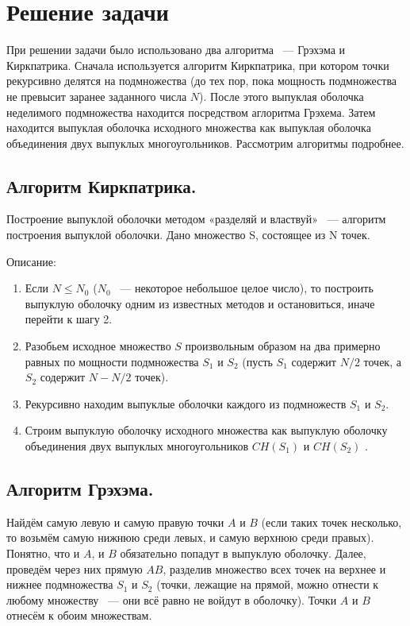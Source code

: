 \documentclass[12pt]{article}
\begin{document}
\section{Решение задачи}
При решении задачи было использовано два алгоритма ~--- Грэхэма и Киркпатрика. Сначала используется алгоритм Киркпатрика, при котором точки рекурсивно делятся на подмножества (до тех пор, пока мощность подмножества не превысит заранее заданного числа $N$). После этого выпуклая оболочка неделимого подмножества находится посредством аглоритма Грэхема. Затем находится выпуклая оболочка исходного множества как выпуклая оболочка объединения двух выпуклых многоугольников.
Рассмотрим алгоритмы подробнее.
\subsection {Алгоритм Киркпатрика.}
Построение выпуклой оболочки методом «разделяй и властвуй» ~--- алгоритм построения выпуклой оболочки.
Дано множество  S, состоящее из  N  точек.


Описание:
\begin {enumerate}
\item Если  $N \leqslant N_0$ ($N_0$ ~--- некоторое небольшое целое число), то построить выпуклую оболочку одним из известных методов и остановиться, иначе перейти к шагу 2.
\item Разобьем исходное множество  $S$  произвольным образом на два примерно равных по мощности подмножества $S_1$ и $S_2$ (пусть $S_1$ содержит  $N/2$  точек, а $S_2$ содержит  $N - N/2$  точек).
\item Рекурсивно находим выпуклые оболочки каждого из подмножеств $S_1$ и $S_2$.
\item Строим выпуклую оболочку исходного множества как выпуклую оболочку объединения двух выпуклых многоугольников  $CH(S_1)$  и  $CH(S_2)$ .
\end{enumerate}
\subsection {Алгоритм Грэхэма.}


Найдём самую левую и самую правую точки $A$ и $B$ (если таких точек несколько, то возьмём самую нижнюю среди левых, и самую верхнюю среди правых). Понятно, что и $A$, и $B$ обязательно попадут в выпуклую оболочку. Далее, проведём через них прямую $AB$, разделив множество всех точек на верхнее и нижнее подмножества $S_1$ и $S_2$ (точки, лежащие на прямой, можно отнести к любому множеству ~--- они всё равно не войдут в оболочку). Точки $A$ и $B$ отнесём к обоим множествам. 
\end{document}
